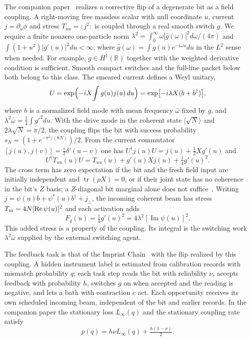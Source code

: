 \documentclass[12pt,a4paper]{article}
\begin{document}
The companion paper~\cite{Liu2026QRAIFB} realizes a corrective flip of a degenerate bit as a field coupling. A right-moving free massless scalar with null coordinate $u$, current $j=\partial_u\phi$ and stress $T_{uu}=:j^2:$ is coupled through a real smooth switch $g$. We require a finite nonzero one-particle norm
$\lambda^2=\int_0^\infty\omega|\hat g(\omega)|^2d\omega/(4\pi)$ and
$\int(1+u^2)|g'(u)|^2du<\infty$, where
$\hat g(\omega)=\int g(u)e^{-i\omega u}du$ in the $L^2$ sense when needed.
For example, $g\in H^1(\mathbb R)$ together with the weighted derivative condition
is sufficient. Smooth compact switches and the full-line packet below both belong
to this class. The smeared current defines a Weyl unitary,
\begin{equation}
U=\exp\Bigl(-iX\!\int g(u)j(u)\,du\Bigr)=\exp[-i\lambda X(b+b^\dagger)],
\end{equation}
where $b$ is a normalized field mode with mean frequency $\bar\omega$ fixed by $g$, and $\lambda^2\bar\omega=\tfrac14\int g'^2du$. With the drive mode in the coherent state $|\sqrt N\rangle$ and $2\lambda\sqrt N=\pi/2$, the coupling flips the bit with success probability $s_N=(1+e^{-\pi^2/(8N)})/2$. From the current commutator $[j(u),j(v)]=\tfrac i2\delta'(u-v)$ one has $U^\dagger j(u)U=j(u)+\tfrac12Xg'(u)$ and
\begin{equation}
U^\dagger T_{uu}(u)U=T_{uu}(u)+g'(u)Xj(u)+\tfrac14g'(u)^2 .
\label{eq:stress-id}
\end{equation}
The cross term has zero expectation if the bit and the fresh field input are initially independent and $\operatorname{tr}(\rho X)=0$, or if their joint state has no coherence in the bit's $Z$ basis; a $Z$-diagonal bit marginal alone does not suffice~\cite{Liu2026QRAIFB}. Writing $j=\psi(u)b+\psi^*(u)b^\dagger+j_\perp$, the incoming coherent beam has stress $T_{\rm in}=4N[\operatorname{Re}\psi(u)]^2$ and each activation adds
\begin{equation}
F_g(u)=\tfrac14g'(u)^2=4\lambda^2[\operatorname{Im}\psi(u)]^2 .
\label{eq:Fg}
\end{equation}
This added stress is a property of the coupling. Its integral is the switching work $\lambda^2\bar\omega$ supplied by the external switching agent.

The feedback task is that of the Imprint Chain~\cite{Liu2026Chain} with the flip realized by this coupling. A hidden instrument label is estimated from calibration records with mismatch probability $q$; each task step reads the bit with reliability $\nu$, accepts feedback with probability $h$, switches $g$ on when accepted and the reading is negative, and lets a bath with contraction $c$ act. Each opportunity receives its own scheduled incoming beam, independent of the bit and earlier records. In the companion paper the stationary loss $L_\infty(q)$ and the stationary coupling rate satisfy~\cite{Liu2026QRAIFB}
\begin{equation}
p(q)=h\nu L_\infty(q)+\tfrac{h(1-\nu)}2 .
\label{eq:rate}
\end{equation}
\end{document}
